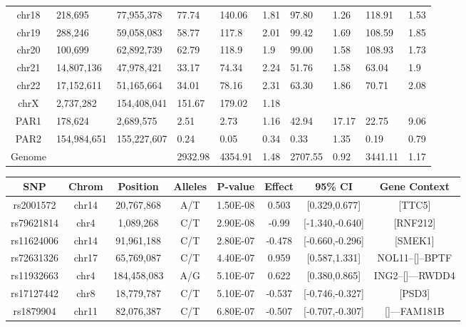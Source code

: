 \begin{table}[!h]
\begin{tabular}{|cp{1.2cm}p{1.4cm}p{1.1cm}p{1.1cm}p{1.0cm}p{1.1cm}p{1.0cm}p{1.1cm}p{1.0cm}|}
chr18 & 218,695 & 77,955,378 & 77.74 & 140.06 & 1.81 & 97.80 & 1.26 & 118.91 & 1.53 \\
chr19 & 288,246 & 59,058,083 & 58.77 & 117.8 & 2.01 & 99.42 & 1.69 & 108.59 & 1.85 \\
chr20 & 100,699 & 62,892,739 & 62.79 & 118.9 & 1.9 & 99.00 & 1.58 & 108.93 & 1.73 \\
chr21 & 14,807,136 & 47,978,421 & 33.17 & 74.34 & 2.24 & 51.76 & 1.58 & 63.04 & 1.9 \\
chr22 & 17,152,611 & 51,165,664 & 34.01 & 78.16 & 2.31 & 63.30 & 1.86 & 70.71 & 2.08 \\
chrX & 2,737,282 & 154,408,041 & 151.67 & 179.02 & 1.18 &  &  &  &  \\
PAR1 & 178,624 & 2,689,575 & 2.51 & 2.73 & 1.16 & 42.94 & 17.17 & 22.75 & 9.06 \\
PAR2 & 154,984,651 & 155,227,607 & 0.24 & 0.05 & 0.34 & 0.33 & 1.35 & 0.19 & 0.79 \\
        \hline Genome &&& 2932.98 & 4354.91 & 1.48 & 2707.55 & 0.92 & 3441.11 & 1.17 \\
    \hline \end{tabular}
\end{table}

\begin{table}[!h] \centering
    \footnotesize
    \begin{tabular}{|cccccccc|}
        \hline 
SNP & Chrom & Position & Alleles & P-value & Effect & 95\% CI & Gene Context \\ \hline
rs2001572 & chr14 & 20,767,868 & A/T & 1.50E-08 & 0.503 & [0.329,0.677] & [TTC5] \\
rs79621814 & chr4 & 1,089,268 & C/T & 2.90E-08 & -0.99 & [-1.340,-0.640] & [RNF212] \\
rs11624006 & chr14 & 91,961,188 & C/T & 2.80E-07 & -0.478 & [-0.660,-0.296] & [SMEK1] \\
rs72631326 & chr17 & 65,769,087 & C/T & 4.40E-07 & 0.959 & [0.587,1.331] & NOL11--[]--BPTF \\
rs11932663 & chr4 & 184,458,083 & A/G & 5.10E-07 & 0.622 & [0.380,0.865] & ING2--[]---RWDD4 \\
rs17127442 & chr8 & 18,779,787 & C/T & 5.10E-07 & -0.537 & [-0.746,-0.327] & [PSD3] \\
rs1879904 & chr11 & 82,076,387 & C/T & 6.80E-07 & -0.507 & [-0.707,-0.307] & []---FAM181B \\
    \hline \end{tabular}
\end{table}

